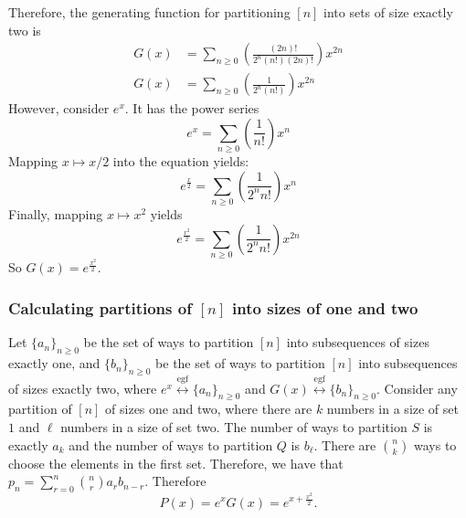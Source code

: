 \documentclass[]{article}
\newcommand{\egf}{\overset{\text{egf}}{\leftrightarrow}}
\begin{document}
Therefore, the generating function for partitioning $[n]$ into sets of size exactly two is
\begin{align*}
	G(x) &= \sum_{n \geq 0} \left(\frac{(2n)!}{2^n (n!)(2n)!}\right) x^{2n}\\
	G(x) &= \sum_{n \geq 0} \left(\frac{1}{2^n (n!)}\right) x^{2n}
\end{align*}
However, consider $e^x$. It has the power series
\begin{equation}
	e^x = \sum_{n \geq 0} \left(\frac{1} {n!}\right) x^{n}
\end{equation}
Mapping $x \mapsto x/2$ into the equation yields:
\begin{equation}
	e^{\frac{x}{2}} = \sum_{n \geq 0} \left(\frac{1} {2^n n!}\right) x^{n}
\end{equation}
Finally, mapping $x \mapsto x^2$ yields
\begin{equation}
	e^{\frac{x^2}{2}} = \sum_{n \geq 0} \left(\frac{1} {2^n n!}\right) x^{2n}
\end{equation}
So $G(x) = e^{\frac{x^2}{2}}$. 
\subsubsection{Calculating partitions of $[n]$ into sizes of one and two}
Let $\lbrace a_n \rbrace_{n \geq 0}$ be the set of ways to partition $[n]$ into subsequences of sizes exactly one, and $\lbrace b_n \rbrace_{n \geq 0}$ be the set of ways to partition $[n]$ into subsequences of sizes exactly two, where $e^x \egf \lbrace a_n \rbrace_{n \geq 0}$ and $G(x) \egf \lbrace b_n \rbrace_{n \geq 0}$. 
Consider any partition of $[n]$ of sizes one and two, where there are $k$ numbers in a size of set $1$ and $\ell$ numbers in a size of set two. The number of ways to partition $S$ is exactly $a_k$ and the number of ways to partition $Q$ is $b_{\ell}$. There are $\binom{n}{k}$ ways to choose the elements in the first set. Therefore, we have that $p_n = \sum_{r = 0}^{n} \binom{n}{r} a_r b_{n-r}$. Therefore 
\begin{equation}
	P(x) = e^x G(x) = e^{x + \frac{x^2}{2}}.
\end{equation}
\end{document}
